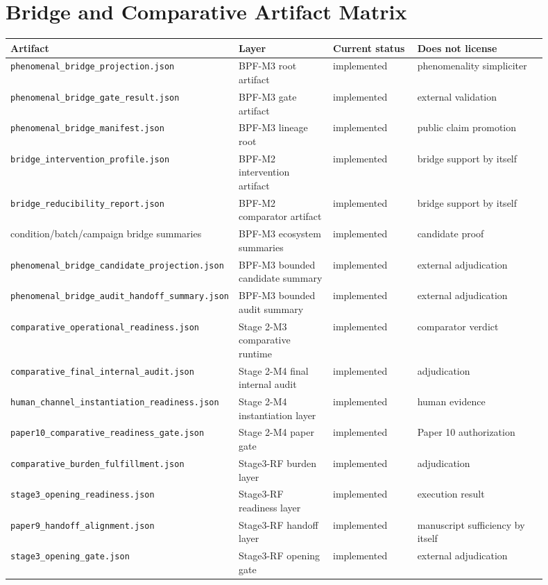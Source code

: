 \documentclass[11pt,a4paper]{article}
\theoremstyle{definition}
\begin{document}
\section{Bridge and Comparative Artifact Matrix}
\begin{center}
\small
\begin{tabularx}{\linewidth}{@{}p{0.31\linewidth}p{0.18\linewidth}p{0.16\linewidth}p{0.25\linewidth}@{}}
\toprule
Artifact & Layer & Current status & Does not license \\
\midrule
\texttt{phenomenal\_bridge\_projection.json} & BPF-M3 root artifact & implemented & phenomenality simpliciter \\
\texttt{phenomenal\_bridge\_gate\_result.json} & BPF-M3 gate artifact & implemented & external validation \\
\texttt{phenomenal\_bridge\_manifest.json} & BPF-M3 lineage root & implemented & public claim promotion \\
\texttt{bridge\_intervention\_profile.json} & BPF-M2 intervention artifact & implemented & bridge support by itself \\
\texttt{bridge\_reducibility\_report.json} & BPF-M2 comparator artifact & implemented & bridge support by itself \\
condition/batch/campaign bridge summaries & BPF-M3 ecosystem summaries & implemented & candidate proof \\
\texttt{phenomenal\_bridge\_candidate\_projection.json} & BPF-M3 bounded candidate summary & implemented & external adjudication \\
\texttt{phenomenal\_bridge\_audit\_handoff\_summary.json} & BPF-M3 bounded audit summary & implemented & external adjudication \\
\texttt{comparative\_operational\_readiness.json} & Stage 2-M3 comparative runtime & implemented & comparator verdict \\
\texttt{comparative\_final\_internal\_audit.json} & Stage 2-M4 final internal audit & implemented & adjudication \\
\texttt{human\_channel\_instantiation\_readiness.json} & Stage 2-M4 instantiation layer & implemented & human evidence \\
\texttt{paper10\_comparative\_readiness\_gate.json} & Stage 2-M4 paper gate & implemented & Paper 10 authorization \\
\texttt{comparative\_burden\_fulfillment.json} & Stage3-RF burden layer & implemented & adjudication \\
\texttt{stage3\_opening\_readiness.json} & Stage3-RF readiness layer & implemented & execution result \\
\texttt{paper9\_handoff\_alignment.json} & Stage3-RF handoff layer & implemented & manuscript sufficiency by itself \\
\texttt{stage3\_opening\_gate.json} & Stage3-RF opening gate & implemented & external adjudication \\
\bottomrule
\end{tabularx}
\end{center}
\end{document}
